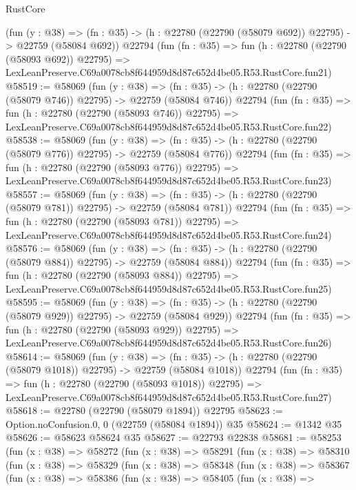\begin{lexlean}{RustCore}
\begin{coremodule}
    (fun (y : @38) =>
    (fn : @35) -> (h : @22780 (@22790 (@58079 @692)) @22795) -> @22759 (@58084 @692))
    @22794
    (fun (fn : @35) =>
    fun (h : @22780 (@22790 (@58093 @692)) @22795) =>
    LexLeanPreserve.C69a0078cb8f644959d8d87c652d4be05.R53.RustCore.fun21)
@58519 := @58069
    (fun (y : @38) =>
    (fn : @35) -> (h : @22780 (@22790 (@58079 @746)) @22795) -> @22759 (@58084 @746))
    @22794
    (fun (fn : @35) =>
    fun (h : @22780 (@22790 (@58093 @746)) @22795) =>
    LexLeanPreserve.C69a0078cb8f644959d8d87c652d4be05.R53.RustCore.fun22)
@58538 := @58069
    (fun (y : @38) =>
    (fn : @35) -> (h : @22780 (@22790 (@58079 @776)) @22795) -> @22759 (@58084 @776))
    @22794
    (fun (fn : @35) =>
    fun (h : @22780 (@22790 (@58093 @776)) @22795) =>
    LexLeanPreserve.C69a0078cb8f644959d8d87c652d4be05.R53.RustCore.fun23)
@58557 := @58069
    (fun (y : @38) =>
    (fn : @35) -> (h : @22780 (@22790 (@58079 @781)) @22795) -> @22759 (@58084 @781))
    @22794
    (fun (fn : @35) =>
    fun (h : @22780 (@22790 (@58093 @781)) @22795) =>
    LexLeanPreserve.C69a0078cb8f644959d8d87c652d4be05.R53.RustCore.fun24)
@58576 := @58069
    (fun (y : @38) =>
    (fn : @35) -> (h : @22780 (@22790 (@58079 @884)) @22795) -> @22759 (@58084 @884))
    @22794
    (fun (fn : @35) =>
    fun (h : @22780 (@22790 (@58093 @884)) @22795) =>
    LexLeanPreserve.C69a0078cb8f644959d8d87c652d4be05.R53.RustCore.fun25)
@58595 := @58069
    (fun (y : @38) =>
    (fn : @35) -> (h : @22780 (@22790 (@58079 @929)) @22795) -> @22759 (@58084 @929))
    @22794
    (fun (fn : @35) =>
    fun (h : @22780 (@22790 (@58093 @929)) @22795) =>
    LexLeanPreserve.C69a0078cb8f644959d8d87c652d4be05.R53.RustCore.fun26)
@58614 := @58069
    (fun (y : @38) =>
    (fn : @35) -> (h : @22780 (@22790 (@58079 @1018)) @22795) -> @22759 (@58084 @1018))
    @22794
    (fun (fn : @35) =>
    fun (h : @22780 (@22790 (@58093 @1018)) @22795) =>
    LexLeanPreserve.C69a0078cb8f644959d8d87c652d4be05.R53.RustCore.fun27)
@58618 := @22780 (@22790 (@58079 @1894)) @22795
@58623 := Option.noConfusion.{0, 0} (@22759 (@58084 @1894)) @35
@58624 := @1342 @35
@58626 := @58623 @58624 @35
@58627 := @22793 @22838
@58681 := @58253
    (fun (x : @38) =>
    @58272
      (fun (x : @38) =>
      @58291
        (fun (x : @38) =>
        @58310
          (fun (x : @38) =>
          @58329
            (fun (x : @38) =>
            @58348
              (fun (x : @38) =>
              @58367
                (fun (x : @38) =>
                @58386
                  (fun (x : @38) =>
                  @58405
                    (fun (x : @38) =>

\end{coremodule}
\end{lexlean}
